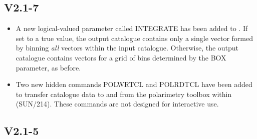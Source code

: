\documentclass[twoside,11pt]{starlink}
\begin{document}
\subsection{V2.1-7}
\begin{itemize}

\item A new logical-valued parameter called INTEGRATE has been added to
. If set to a true value, the output catalogue
contains only a single vector formed by binning \emph{all} vectors
within the input catalogue. Otherwise, the output catalogue contains
vectors for a grid of bins determined by the BOX parameter, as before.

\item Two new hidden commands POLWRTCL and POLRDTCL have been added to
transfer catalogue data to and from the polarimetry toolbox within
 (SUN/214). These commands are not
designed for interactive use.
\end{itemize}

\subsection{V2.1-5}
\end{document}
